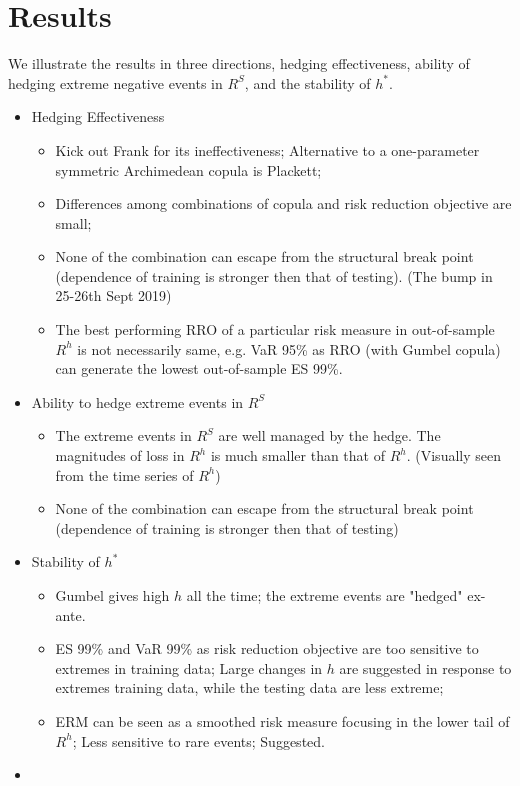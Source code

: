 \section{Results}
We illustrate the results in three directions, hedging effectiveness,
ability of hedging extreme negative events in $R^S$, and the stability of $h^*$.

\begin{itemize}
   \item  Hedging Effectiveness
   \begin{itemize}
     \item Kick out Frank for its ineffectiveness; Alternative to a
       one-parameter symmetric Archimedean copula is Plackett;
     \item Differences among combinations of copula and risk reduction objective are small;
     \item None of the combination can escape from the structural break point (dependence of training is stronger then that of testing). (The bump in 25-26th Sept 2019)
     \item The best performing RRO of a particular risk measure in out-of-sample $R^h$ is not necessarily same, e.g.
      VaR 95\% as RRO (with Gumbel copula) can generate the lowest out-of-sample ES 99\%.
   \end{itemize}
   \item Ability to hedge extreme events in $R^S$
   \begin{itemize}
     \item The extreme events in $R^S$ are well managed by the hedge.
     The magnitudes of loss in $R^h$ is much smaller than that of $R^h$. (Visually seen from the time series of $R^h$)
     \item None of the combination can escape from the structural break point (dependence of training is stronger then that of testing)
   \end{itemize}
   \item Stability of $h^\ast$
   \begin{itemize}
     \item Gumbel gives high $h$ all the time; the extreme events are "hedged" ex-ante.
     \item ES 99\% and VaR 99\% as risk reduction objective are too sensitive to extremes in training data;
     Large changes in $h$ are suggested in response to extremes training data, while the testing data are less extreme;
     \item ERM can be seen as a smoothed risk measure focusing in the lower tail of $R^h$; Less sensitive to rare events; Suggested.
   \end{itemize}
\item \end{itemize}


